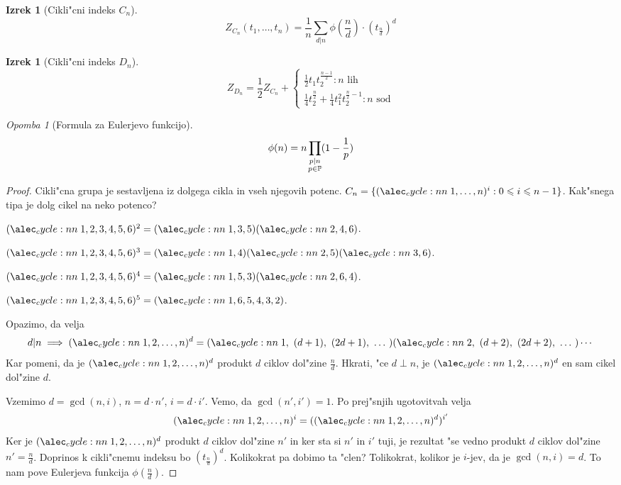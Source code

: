 \documentclass[a4paper,12pt]{article}
\theoremstyle{definition}
\newtheorem{theorem}[counter]{Izrek}
\theoremstyle{remark}
\newtheorem*{rem}{Opomba}
\begin{document}
\begin{theorem}[Cikli"cni indeks $C_n$]
	\[ Z_{C_n}(t_1, \ldots, t_n) = \frac{1}{n}\sum_{d | n} \phi\left(\frac{n}{d}\right) \cdot (t_{\frac{n}{d}})^d \]
\end{theorem}
\begin{theorem}[Cikli"cni indeks $D_n$]
	\[	Z_{D_n} = \frac{1}{2}Z_{C_n} +
	\begin{cases}
		\frac{1}{2} t_1 t_2^{\frac{n-1}{2}}: n \text{ lih}
		\\
		\frac{1}{4} t_2^{\frac{n}{2}} + \frac{1}{4} t_1^2 t_2^{\frac{n}{2}-1}: n \text{ sod}
	\end{cases}
	\]
\end{theorem}
\begin{rem}[Formula za Eulerjevo funkcijo]
	\[\phi(n) = n \prod_{\mathclap{\substack{p|n \\ p \in \mathbb{P}}}}(1-\frac{1}{p})\]
\end{rem}
\begin{proof}
	Cikli"cna grupa je sestavljena iz dolgega cikla in vseh njegovih potenc. $C_n = \{\cycle{1, \ldots, n}^i: 0 \leqslant i \leqslant n-1 \}$. Kak"snega tipa je dolg cikel na neko potenco?
	
	$\cycle{1, 2, 3, 4, 5, 6}^2 = \cycle{1, 3, 5}\cycle{2, 4, 6}$.
	
	$\cycle{1, 2, 3, 4, 5, 6}^3 = \cycle{1, 4}\cycle{2, 5}\cycle{3, 6}$.
	
	$\cycle{1, 2, 3, 4, 5, 6}^4 = \cycle{1, 5, 3}\cycle{2, 6, 4}$.

	$\cycle{1, 2, 3, 4, 5, 6}^5 = \cycle{1, 6, 5, 4, 3, 2}$.
	
	Opazimo, da velja
	\[d | n \implies \cycle{1, 2, \ldots, n}^d = \cycle{1,\ (d+1),\ (2d+1),\ \ldots \ }\cycle{2,\ (d+2),\ (2d+2),\ \ldots \ }\cdots\]
	Kar pomeni, da je $\cycle{1, 2, \ldots, n}^d$ produkt $d$ ciklov dol"zine $\frac{n}{d}$. Hkrati, "ce $d \perp n$, je $\cycle{1, 2, \ldots, n}^d$ en sam cikel dol"zine $d$.

	Vzemimo $d=\gcd(n, i)$, $n=d\cdot n'$, $i = d \cdot i'$. Vemo, da $\gcd(n', i')=1$. Po prej"snjih ugotovitvah velja
	\[\cycle{1, 2, \ldots, n}^i = (\cycle{1, 2, \ldots, n}^d)^{i'}\]
	Ker je $\cycle{1, 2, \ldots, n}^d$ produkt $d$ ciklov dol"zine $n'$ in ker sta si $n'$ in $i'$ tuji, je rezultat "se vedno produkt $d$ ciklov dol"zine $n'=\frac{n}{d}$. Doprinos k cikli"cnemu indeksu bo $(t_{\frac{n}{d}})^d$. Kolikokrat pa dobimo ta "clen? Tolikokrat, kolikor je $i$-jev, da je $\gcd(n, i)=d$. To nam pove Eulerjeva funkcija $\phi(\frac{n}{d})$.
\end{proof}
\end{document}
